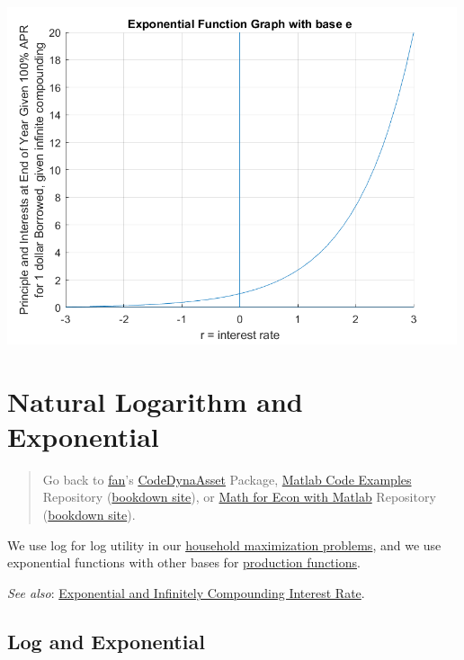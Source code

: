 \documentclass[
]{book}
\begin{document}
\includegraphics[width=5.20833in,height=\textheight]{img/exponential_images/figure_2.png}

\hypertarget{natural-logarithm-and-exponential}{%
\section{Natural Logarithm and Exponential}\label{natural-logarithm-and-exponential}}

\begin{quote}
Go back to \href{http://fanwangecon.github.io/}{fan}'s \href{https://fanwangecon.github.io/CodeDynaAsset/}{CodeDynaAsset} Package, \href{https://fanwangecon.github.io/M4Econ/}{Matlab Code Examples} Repository (\href{https://fanwangecon.github.io/M4Econ/bookdown}{bookdown site}), or \href{https://fanwangecon.github.io/Math4Econ/}{Math for Econ with Matlab} Repository (\href{https://fanwangecon.github.io/Math4Econ/bookdown}{bookdown site}).
\end{quote}

We use log for log utility in our \href{https://fanwangecon.github.io/Math4Econ/derivative_application/K_save_households.html}{household maximization
problems},
and we use exponential functions with other bases for \href{https://fanwangecon.github.io/Math4Econ/derivative_application/K_borrow_firm.html}{production
functions}.

\emph{See also}: \href{https://fanwangecon.github.io/Math4Econ/explog/exponential.html}{Exponential and Infinitely Compounding Interest
Rate}.

\hypertarget{log-and-exponential}{%
\subsection{Log and Exponential}\label{log-and-exponential}}
\end{document}
